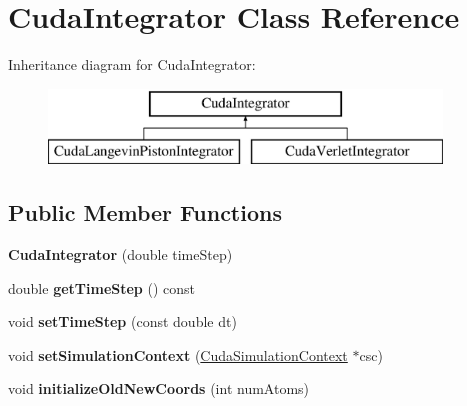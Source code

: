 \hypertarget{classCudaIntegrator}{}\section{Cuda\+Integrator Class Reference}
\label{classCudaIntegrator}
Inheritance diagram for Cuda\+Integrator\+:\begin{figure}[H]
\begin{center}
\leavevmode
\includegraphics[height=2.000000cm]{classCudaIntegrator}
\end{center}
\end{figure}
\subsection*{Public Member Functions}
\begin{DoxyCompactItemize}
\item 
\hypertarget{classCudaIntegrator_ab7621d9a4ab2670adae56bc60cde75d0}{}\label{classCudaIntegrator_ab7621d9a4ab2670adae56bc60cde75d0} 
{\bfseries Cuda\+Integrator} (double time\+Step)
\item 
\hypertarget{classCudaIntegrator_af8f36da06802610a606bc1ac2ce978d7}{}\label{classCudaIntegrator_af8f36da06802610a606bc1ac2ce978d7} 
double {\bfseries get\+Time\+Step} () const
\item 
\hypertarget{classCudaIntegrator_a97a3ee2ca6b5501813eab968e65af0e2}{}\label{classCudaIntegrator_a97a3ee2ca6b5501813eab968e65af0e2} 
void {\bfseries set\+Time\+Step} (const double dt)
\item 
\hypertarget{classCudaIntegrator_ac74c2487586d922c28bd7b82a21c22af}{}\label{classCudaIntegrator_ac74c2487586d922c28bd7b82a21c22af} 
void {\bfseries set\+Simulation\+Context} (\hyperlink{classCudaSimulationContext}{Cuda\+Simulation\+Context} $\ast$csc)
\item 
\hypertarget{classCudaIntegrator_a4621ef339356331a782a00e392293364}{}\label{classCudaIntegrator_a4621ef339356331a782a00e392293364} 
void {\bfseries initialize\+Old\+New\+Coords} (int num\+Atoms)
\end{DoxyCompactItemize}
